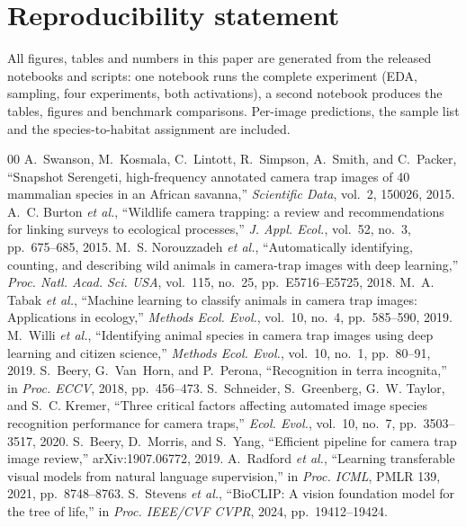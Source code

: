 \documentclass[conference]{IEEEtran}
\begin{document}
\section*{Reproducibility statement}
All figures, tables and numbers in this paper are generated from the released notebooks and scripts: one notebook runs the complete experiment (EDA, sampling, four experiments, both activations), a second notebook produces the tables, figures and benchmark comparisons. Per-image predictions, the sample list and the species-to-habitat assignment are included.

\begin{thebibliography}{00}
 A.~Swanson, M.~Kosmala, C.~Lintott, R.~Simpson, A.~Smith, and C.~Packer, ``Snapshot Serengeti, high-frequency annotated camera trap images of 40 mammalian species in an African savanna,'' \emph{Scientific Data}, vol.~2, 150026, 2015.
 A.~C. Burton \emph{et al.}, ``Wildlife camera trapping: a review and recommendations for linking surveys to ecological processes,'' \emph{J. Appl. Ecol.}, vol.~52, no.~3, pp.~675--685, 2015.
 M.~S. Norouzzadeh \emph{et al.}, ``Automatically identifying, counting, and describing wild animals in camera-trap images with deep learning,'' \emph{Proc. Natl. Acad. Sci. USA}, vol.~115, no.~25, pp.~E5716--E5725, 2018.
 M.~A. Tabak \emph{et al.}, ``Machine learning to classify animals in camera trap images: Applications in ecology,'' \emph{Methods Ecol. Evol.}, vol.~10, no.~4, pp.~585--590, 2019.
 M.~Willi \emph{et al.}, ``Identifying animal species in camera trap images using deep learning and citizen science,'' \emph{Methods Ecol. Evol.}, vol.~10, no.~1, pp.~80--91, 2019.
 S.~Beery, G.~Van~Horn, and P.~Perona, ``Recognition in terra incognita,'' in \emph{Proc. ECCV}, 2018, pp.~456--473.
 S.~Schneider, S.~Greenberg, G.~W. Taylor, and S.~C. Kremer, ``Three critical factors affecting automated image species recognition performance for camera traps,'' \emph{Ecol. Evol.}, vol.~10, no.~7, pp.~3503--3517, 2020.
 S.~Beery, D.~Morris, and S.~Yang, ``Efficient pipeline for camera trap image review,'' arXiv:1907.06772, 2019.
 A.~Radford \emph{et al.}, ``Learning transferable visual models from natural language supervision,'' in \emph{Proc. ICML}, PMLR 139, 2021, pp.~8748--8763.
 S.~Stevens \emph{et al.}, ``BioCLIP: A vision foundation model for the tree of life,'' in \emph{Proc. IEEE/CVF CVPR}, 2024, pp.~19412--19424.

\end{thebibliography}
\end{document}
